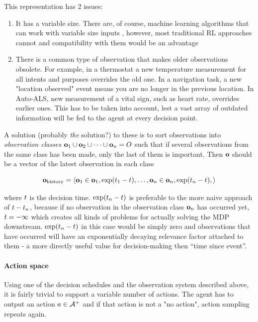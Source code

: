 This representation has 2 issues: 
\begin{enumerate}
    \item It has a variable size. There are, of course, machine learning algorithms that can work with variable size inputs \cite{hochreiterLongShorttermMemory1997}, however, most traditional RL approaches cannot and compatibility with them would be an advantage
    \item There is a common type of observation that makes older observations obsolete. For example, in a thermostat a new temperature measurement for all intents and purposes overrides the old one. In a navigation task, a new "location observed" event means you are no longer in the previous location. In Auto-ALS, new measurement of a vital sign, such as heart rate, overrides earlier ones. This has to be taken into account, lest a vast array of outdated information will be fed to the agent at every decision point.
\end{enumerate}

A solution (probably \emph{the} solution?) to these is to sort observations into \emph{observation classes} $\mathbf{o}_1 \cup \mathbf{o}_2 \cup \dots \cup \mathbf{o}_n = O$ such that if several observations from the same class has been made, only the last of them is important. Then $\mathbf{o}$ should be a vector of the latest observation in each class

\begin{equation} 
  \mathbf{o}_\text{history} = \langle \mathbf{o}_1 \in \mathbf{o}_1, \exp(t_1-t), \dots, \mathbf{o}_n \in \mathbf{o}_n, \exp(t_n-t), \rangle
\end{equation}

where $t$ is the decision time. 
$\exp(t_n-t)$ is preferable to the more naive approach of $t-t_n$, because if no observation in the observation class $\mathbf{o}_n$ has occurred yet, $t=-\infty$ which creates all kinds of problems for actually solving the MDP downstream. 
$\exp(t_n-t)$ in this case would be simply zero and observations that have occurred will have an exponentially decaying relevance factor attached to them - a more directly useful value for decision-making then ``time since event''.

\paragraph{Action space}

Using one of the decision schedules and the observation system described above, it is fairly trivial to support a variable number of actions. 
The agent has to output an action $a \in \mathcal{A}^{+}$ and if that action is not a "no action", action sampling repeats again.

